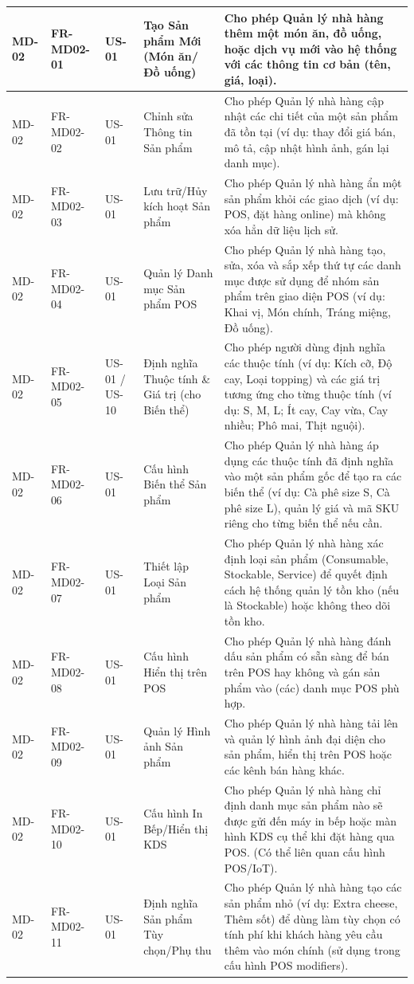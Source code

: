 \begin{longtable}{|m{2cm}|m{2.5cm}|m{2cm}|m{4cm}|m{4.5cm}|}
MD-02 & FR-MD02-01 & US-01 & Tạo Sản phẩm Mới (Món ăn/Đồ uống) & Cho phép Quản lý nhà hàng thêm một món ăn, đồ uống, hoặc dịch vụ mới vào hệ thống với các thông tin cơ bản (tên, giá, loại). \\
\hline
MD-02 & FR-MD02-02 & US-01 & Chỉnh sửa Thông tin Sản phẩm & Cho phép Quản lý nhà hàng cập nhật các chi tiết của một sản phẩm đã tồn tại (ví dụ: thay đổi giá bán, mô tả, cập nhật hình ảnh, gán lại danh mục). \\
\hline
MD-02 & FR-MD02-03 & US-01 & Lưu trữ/Hủy kích hoạt Sản phẩm & Cho phép Quản lý nhà hàng ẩn một sản phẩm khỏi các giao dịch (ví dụ: POS, đặt hàng online) mà không xóa hẳn dữ liệu lịch sử. \\
\hline
MD-02 & FR-MD02-04 & US-01 & Quản lý Danh mục Sản phẩm POS & Cho phép Quản lý nhà hàng tạo, sửa, xóa và sắp xếp thứ tự các danh mục được sử dụng để nhóm sản phẩm trên giao diện POS (ví dụ: Khai vị, Món chính, Tráng miệng, Đồ uống). \\
\hline
MD-02 & FR-MD02-05 & US-01 / US-10 & Định nghĩa Thuộc tính \& Giá trị (cho Biến thể) & Cho phép người dùng định nghĩa các thuộc tính (ví dụ: Kích cỡ, Độ cay, Loại topping) và các giá trị tương ứng cho từng thuộc tính (ví dụ: S, M, L; Ít cay, Cay vừa, Cay nhiều; Phô mai, Thịt nguội). \\
\hline
MD-02 & FR-MD02-06 & US-01 & Cấu hình Biến thể Sản phẩm & Cho phép Quản lý nhà hàng áp dụng các thuộc tính đã định nghĩa vào một sản phẩm gốc để tạo ra các biến thể (ví dụ: Cà phê size S, Cà phê size L), quản lý giá và mã SKU riêng cho từng biến thể nếu cần. \\
\hline
MD-02 & FR-MD02-07 & US-01 & Thiết lập Loại Sản phẩm & Cho phép Quản lý nhà hàng xác định loại sản phẩm (Consumable, Stockable, Service) để quyết định cách hệ thống quản lý tồn kho (nếu là Stockable) hoặc không theo dõi tồn kho. \\
\hline
MD-02 & FR-MD02-08 & US-01 & Cấu hình Hiển thị trên POS & Cho phép Quản lý nhà hàng đánh dấu sản phẩm có sẵn sàng để bán trên POS hay không và gán sản phẩm vào (các) danh mục POS phù hợp. \\
\hline
MD-02 & FR-MD02-09 & US-01 & Quản lý Hình ảnh Sản phẩm & Cho phép Quản lý nhà hàng tải lên và quản lý hình ảnh đại diện cho sản phẩm, hiển thị trên POS hoặc các kênh bán hàng khác. \\
\hline
MD-02 & FR-MD02-10 & US-01 & Cấu hình In Bếp/Hiển thị KDS & Cho phép Quản lý nhà hàng chỉ định danh mục sản phẩm nào sẽ được gửi đến máy in bếp hoặc màn hình KDS cụ thể khi đặt hàng qua POS. (Có thể liên quan cấu hình POS/IoT). \\
\hline
MD-02 & FR-MD02-11 & US-01 & Định nghĩa Sản phẩm Tùy chọn/Phụ thu & Cho phép Quản lý nhà hàng tạo các sản phẩm nhỏ (ví dụ: Extra cheese, Thêm sốt) để dùng làm tùy chọn có tính phí khi khách hàng yêu cầu thêm vào món chính (sử dụng trong cấu hình POS modifiers). \\
\hline

\end{longtable}

